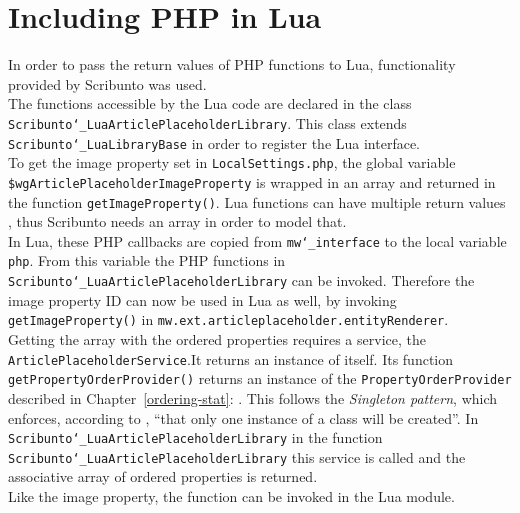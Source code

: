 \section{Including PHP in Lua}\label{including-lua}

In order to pass the return values of PHP functions to Lua, functionality provided by Scribunto was used. \\
The functions accessible by the Lua code are declared in the class \texttt{\justify Scribunto\char`_LuaArticlePlaceholderLibrary}. This class extends \texttt{\justify Scribunto\char`_LuaLibraryBase} in order to register the Lua interface. \\
To get the image property set in \texttt{\justify LocalSettings.php}, the global variable \texttt{\justify \$wgArticlePlaceholderImageProperty} is wrapped in an array and returned in the function \texttt{\justify getImageProperty()}. Lua functions can have multiple return values \citep{luabook:01}, thus Scribunto needs an array in order to model that. \\
In Lua, these PHP callbacks are copied from \texttt{\justify mw\char`_interface} to the local variable \texttt{php}. From this variable the PHP functions in \texttt{\justify Scribunto\char`_LuaArticlePlaceholderLibrary} can be invoked. Therefore the image property ID can now be used in Lua as well, by invoking \texttt{\justify getImageProperty()} in \texttt{\justify mw.ext.articleplaceholder.entityRenderer}. \\
Getting the array with the ordered properties requires a service, the \texttt{ArticlePlaceholderService}.It returns an instance of itself. Its function \texttt{\justify getPropertyOrderProvider()} returns an instance of the \texttt{\justify PropertyOrderProvider} described in Chapter~\ref{ordering-stat}: . This follows the \textit{Singleton pattern}, which enforces, according to \citet{designpattern}, ``that only one instance of a class will be created''.
In \texttt{\justify Scribunto\char`_LuaArticlePlaceholderLibrary} in the function \texttt{\justify Scribunto\char`_LuaArticlePlaceholderLibrary} this service is called and the associative array of ordered properties is returned.\\
Like the image property, the function can be invoked in the Lua module.

